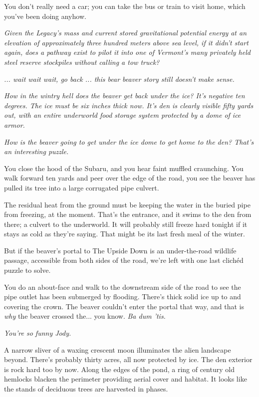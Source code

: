 \documentclass[a5paper, symmetric]{tufte-book}
\begin{document}
You don't really need a car; you can take the bus or train to visit home, which you've been doing anyhow. 

\textit{Given the Legacy's mass and current stored gravitational potential energy at an elevation of approximately three hundred meters above sea level, if it didn't start again, does a pathway exist to pilot it into one of Vermont's many privately held steel reserve stockpiles without calling a tow truck?}

\textit{... wait wait wait, go back ... this bear beaver story still doesn't make sense.}

\textit{How in the wintry hell does the beaver get back under the ice? It's negative ten degrees. The ice must be six inches thick now. It's den is clearly visible fifty yards out, with an entire underworld food storage system protected by a dome of ice armor. }

\textit{How is the beaver going to get under the ice dome to get home to the den? That's an interesting puzzle.}

You close the hood of the Subaru, and you hear faint muffled craunching. You walk forward ten yards and peer over the edge of the road, you see the beaver has pulled its tree into a large corrugated pipe culvert.

The residual heat from the ground must be keeping the water in the buried pipe from freezing, at the moment. That's the entrance, and it swims to the den from there; a culvert to the underworld. It will probably still freeze hard tonight if it stays as cold as they're saying. That might be its last fresh meal of the winter.

But if the beaver's portal to The Upside Down is an under-the-road wildlife passage, accessible from both sides of the road, we're left with one last clichéd puzzle to solve. 

You do an about-face and walk to the downstream side of the road to see the pipe outlet has been submerged by flooding. There's thick solid ice up to and covering the crown. The beaver couldn't enter the portal that way, and that is \textit{why} the beaver crossed the... you know. \textit{Ba dum 'tis.}

\textit{You're so funny Jody.}

A narrow sliver of a waxing crescent moon illuminates the alien landscape beyond. There's probably thirty acres, all now protected by ice. The den exterior is rock hard too by now. Along the edges of the pond, a ring of century old hemlocks blacken the perimeter providing aerial cover and habitat. It looks like the stands of deciduous trees are harvested in phases. 
\end{document}
